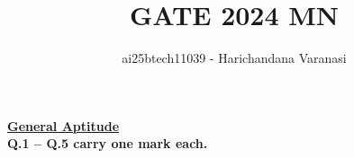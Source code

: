 \documentclass[journal]{IEEEtran}
\begin{document}

\vspace{3cm}
\title{GATE 2024 MN }
\author{ai25btech11039
- Harichandana Varanasi}
\maketitle
{\let\newpage\relax\maketitle}
{\let\newpage\relax\maketitle}
\renewcommand{\thefigure}{\theenumi}
\renewcommand{\thetable}{\theenumi}
\setlength{\intextsep}{10pt} %
\noindent\underline{\textbf{General Aptitude}}\\[0.5em] 
\noindent\textbf{Q.1 -- Q.5 carry one mark each.}
\vspace{0.5em}
\end{document}
